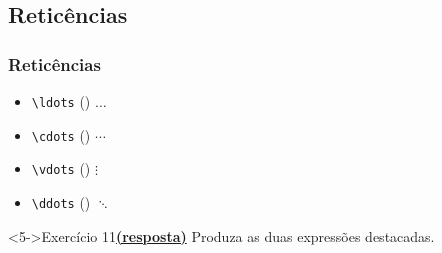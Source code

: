 \documentclass[handout,10pt]{beamer}
\begin{document}
\subsection{Reticências}
\begin{frame}[fragile]
	\frametitle{Reticências}	
	
	\begin{itemize}
		\item<1-> \verb|\ldots| ()    \hfill {\LARGE\(\ldots\)}
		\item<2-> \verb|\cdots| () \hfill {\LARGE\(\cdots\)}
		\item<3-> \verb|\vdots| () \hfill {\LARGE\(\vdots\)}
		\item<4-> \verb|\ddots| () \hfill {\LARGE\(\ddots\)}
	\end{itemize}
	
	
	\begin{center}
		\hfill
		\hfill
		\hfill
	\end{center}
	
	
	\begin{block}<5->{Exercício 11\hyperlink{respostas9-13}{\footnotesize\textbf{(resposta)}}}
			Produza as duas expressões \alert{destacadas}.
	\end{block}
	
\end{frame}
\end{document}
